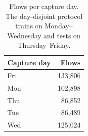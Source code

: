 \begin{table}[htbp]
\centering
\caption{Flows per capture day. The day-disjoint protocol trains on Monday--Wednesday and tests on Thursday--Friday.}
\label{tab:days}
\footnotesize
\begin{tabular}{lr}
\hline
Capture day & Flows \\
\hline
Fri & 133,806 \\
Mon & 102,898 \\
Thu & 86,852 \\
Tue & 86,489 \\
Wed & 125,024 \\
\hline
\end{tabular}
\end{table}

